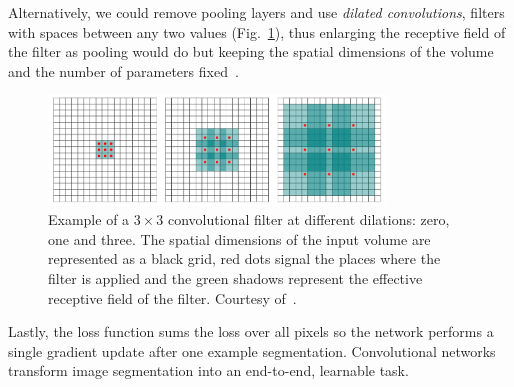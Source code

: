Alternatively, we could remove pooling layers and use \emph{dilated convolutions}, filters with spaces between any two values (Fig.~\ref{fig:DilatedConvolutions}), thus enlarging the receptive field of the filter as pooling would do but keeping the spatial dimensions of the volume and the number of parameters fixed~\cite{Yu2016}.
\begin{figure}[h]
	\centering
	\includegraphics[width=0.8\textwidth]{plots/dilatedConv.png}
	\caption[Example of dilated convolutions]{Example of a $3\times3$ convolutional filter at different dilations: zero, one and three. The spatial dimensions of the input volume are represented as a black grid, red dots signal the places where the filter is applied and the green shadows represent the effective receptive field of the filter. Courtesy of~\cite{Yu2016}.}
	\label{fig:DilatedConvolutions}
\end{figure}

Lastly, the loss function sums the loss over all pixels so the network performs a single gradient update after one example segmentation. Convolutional networks transform image segmentation into an end-to-end, learnable task.

